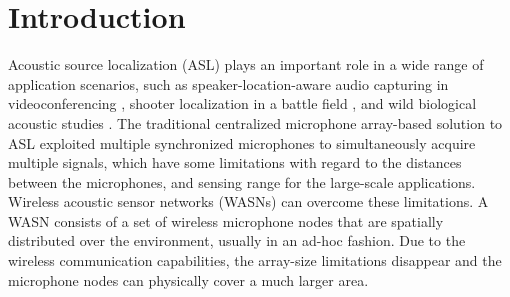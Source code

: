 
\section{Introduction}

Acoustic source localization (ASL) plays an important role in a wide range of application scenarios, such
as speaker-location-aware audio capturing in videoconferencing \cite{guo2011localising}, shooter localization in a battle field \cite{sallai2011acoustic}, and wild biological acoustic studies \cite{allen2008voxnet}. 
The traditional centralized microphone array-based solution to ASL exploited multiple synchronized microphones to simultaneously acquire multiple signals, 
which have some limitations with regard to the distances between the microphones, and sensing range for the large-scale applications.
Wireless acoustic sensor networks (WASNs) can overcome these limitations. 
A WASN consists of a set of wireless microphone nodes that are spatially distributed over the environment, usually in an ad-hoc fashion. 
Due to the wireless communication capabilities, the array-size limitations disappear and the microphone nodes can physically cover a much larger area. 

